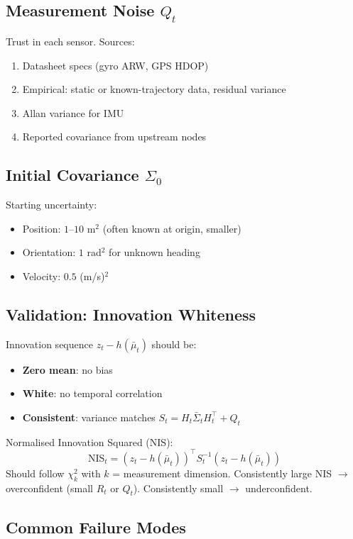 \documentclass[11pt,a4paper]{article}
\begin{document}
\subsection{Measurement Noise $Q_t$}

Trust in each sensor. Sources:
\begin{enumerate}
\item Datasheet specs (gyro ARW, GPS HDOP)
\item Empirical: static or known-trajectory data, residual variance
\item Allan variance for IMU
\item Reported covariance from upstream nodes
\end{enumerate}

\subsection{Initial Covariance $\Sigma_0$}

Starting uncertainty:
\begin{itemize}
\item Position: $1$--$10$ m$^2$ (often known at origin, smaller)
\item Orientation: $1$ rad$^2$ for unknown heading
\item Velocity: $0.5$ (m/s)$^2$
\end{itemize}

\subsection{Validation: Innovation Whiteness}

Innovation sequence $z_t - h(\bar{\mu}_t)$ should be:
\begin{itemize}
\item \textbf{Zero mean}: no bias
\item \textbf{White}: no temporal correlation
\item \textbf{Consistent}: variance matches $S_t = H_t \bar{\Sigma}_t H_t^\top + Q_t$
\end{itemize}

Normalised Innovation Squared (NIS):
\[
\mathrm{NIS}_t = (z_t - h(\bar{\mu}_t))^\top S_t^{-1}(z_t - h(\bar{\mu}_t))
\]
Should follow $\chi^2_k$ with $k$ = measurement dimension. Consistently large NIS $\to$ overconfident (small $R_t$ or $Q_t$). Consistently small $\to$ underconfident.

\subsection{Common Failure Modes}
\end{document}
